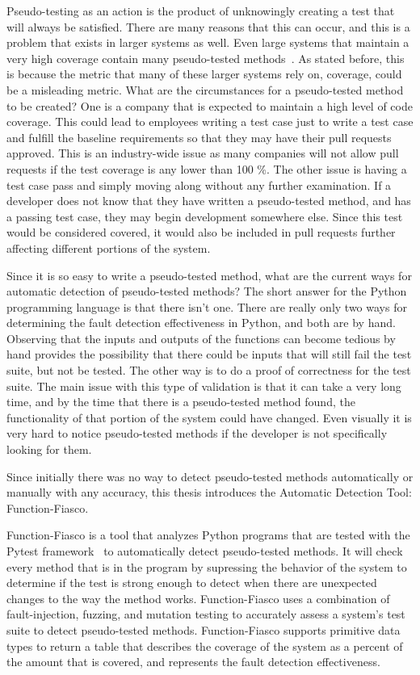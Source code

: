 Pseudo-testing as an action is the product of unknowingly creating a test that will always be satisfied. There are many reasons that this can occur, and this is a problem that exists in larger systems as well. Even large systems that maintain a very high coverage contain many pseudo-tested methods~\cite{vera2017comprehensive}. As stated before, this is because the metric that many of these larger systems rely on, coverage, could be a misleading metric. What are the circumstances for a pseudo-tested method to be created? One is a company that is expected to maintain a high level of code coverage. This could lead to employees writing a test case just to write a test case and fulfill the baseline requirements so that they may have their pull requests approved. This is an industry-wide issue as many companies will not allow pull requests if the test coverage is any lower than 100 \%\cite{prause2017100}. The other issue is having a test case pass and simply moving along without any further examination. If a developer does not know that they have written a pseudo-tested method, and has a passing test case, they may begin development somewhere else. Since this test would be considered covered, it would also be included in pull requests further affecting different portions of the system.

Since it is so easy to write a pseudo-tested method, what are the current ways for automatic detection of pseudo-tested methods? The short answer for the Python programming language is that there isn't one. There are really only two ways for determining the fault detection effectiveness in Python, and both are by hand. Observing that the inputs and outputs of the functions can become tedious by hand provides the possibility that there could be inputs that will still fail the test suite, but not be tested. The other way is to do a proof of correctness for the test suite. The main issue with this type of validation is that it can take a very long time, and by the time that there is a pseudo-tested method found, the functionality of that portion of the system could have changed. Even visually it is very hard to notice pseudo-tested methods if the developer is not specifically looking for them.

Since initially there was no way to detect pseudo-tested methods automatically or manually with any accuracy, this thesis introduces the Automatic Detection Tool: Function-Fiasco.

Function-Fiasco is a tool that analyzes Python programs that are tested with the Pytest framework~\cite{okken_2018} to automatically detect pseudo-tested methods. It will check every method that is in the program by supressing the behavior of the system to determine if the test is strong enough to detect when there are unexpected changes to the way the method works. Function-Fiasco uses a combination of fault-injection, fuzzing, and mutation testing to accurately assess a system's test suite to detect pseudo-tested methods. Function-Fiasco supports primitive data types to return a table that describes the coverage of the system as a percent of the amount that is covered, and represents the fault detection effectiveness.

